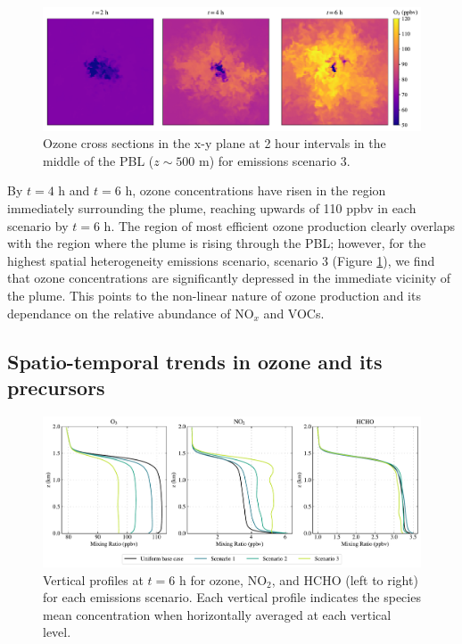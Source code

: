   \begin{figure}[!h]
    \centering
    \includegraphics[width=.9\textwidth]{figures/chapter4/o3-crosssec-point-source-1x1-z25.pdf}
    \caption{Ozone cross sections in the x-y plane at 2 hour intervals in the middle of the PBL ($z\sim500$ \si{m}) for emissions scenario 3.}
    \label{fig:o3-crosssec-s3}
\end{figure}

By $t=4$ h and $t=6$ h, ozone concentrations have risen in the region immediately surrounding the plume, reaching upwards of 110 \si{ppbv} in each scenario by $t=6$ h. The region of most efficient ozone production clearly overlaps with the region where the plume is rising through the PBL; however, for the highest spatial heterogeneity emissions scenario, scenario 3 (Figure \ref{fig:o3-crosssec-s3}), we find that ozone concentrations are significantly depressed in the immediate vicinity of the plume. This points to the non-linear nature of ozone production and its dependance on the relative abundance of NO$_x$ and VOCs.

\subsection{Spatio-temporal trends in ozone and its precursors}

\begin{figure}[h]
    \centering
    \includegraphics[width=\textwidth]{figures/chapter4/vertical-profiles-time36.pdf}
    \caption{Vertical profiles at $t=6$ h for ozone, NO$_2$, and HCHO (left to right) for each emissions scenario. Each vertical profile indicates the species mean concentration when horizontally averaged at each vertical level.}
    \label{fig:vertical-profiles-o3-nox-hcho}
  \end{figure}
  
